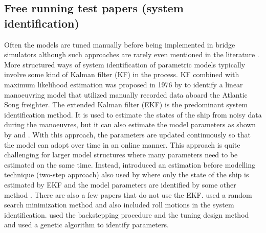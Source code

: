 \subsection{Free running test papers (system identification)} \label{sec:FT} %
Often the models are tuned manually before being implemented in bridge simulators although such approaches are rarely even mentioned in the literature \cite{sutuloAlgorithmOfflineIdentification2014}. More structured ways of system identification of parametric models typically involve some kind of Kalman filter (KF) in the process. KF combined with maximum likelihood estimation was proposed in 1976 by \textcite{astromIdentificationShipSteering1976} to identify a linear manoeuvring model that utilized manually recorded data aboard the Atlantic Song freighter. The extended Kalman filter (EKF) is the predominant system identification method. It is used to estimate the states of the ship from noisy data during the manoeuvres, but it can also estimate the model parameters as shown by \textcite{shiIdentificationShipManeuvering2009} and \textcite{pereraSystemIdentificationNonlinear2015}. With this approach, the parameters are updated continuously so that the model can adopt over time in an online manner. This approach is quite challenging for larger model structures where many parameters need to be estimated on the same time. Instead, \textcite{yoonIdentificationHydrodynamicCoefficients2003} introduced an estimation before modelling technique  (two-step approach) also used by \textcite{revestidoherreroTwostepIdentificationNonlinear2012} where only the state of the ship is estimated by EKF and the model parameters are identified by some other method .  
There are also a few papers that do not use the EKF. \textcite{tianoMultivariableIdentificationShip1997} used a random search minimization method and also included roll motions in the system identification. \textcite{casadoIdentificationNonlinearShip2005} used the backstepping procedure and the tuning design method and \textcite{millerShipModelIdentification2021} used a genetic algorithm to identify parameters.

